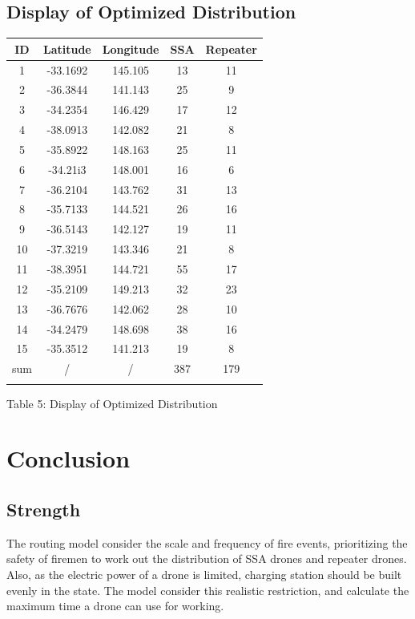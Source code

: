 \documentclass{mcmthesis}
\begin{document}
\subsection{Display of Optimized Distribution}
\begin{center}
	\begin{tabular}{ccccc}
		\hline
		ID & Latitude & Longitude & SSA & Repeater \\
		\hline
		
		1 & -33.1692 & 145.105 & 13 & 11 \\
		2 & -36.3844 & 141.143 & 25 & 9 \\
		3 & -34.2354 & 146.429 & 17 & 12 \\
		4 & -38.0913 & 142.082 & 21 & 8 \\
		5 & -35.8922 & 148.163 & 25 & 11 \\
		6 & -34.21i3 & 148.001 & 16 & 6 \\
		7 & -36.2104 & 143.762 & 31 & 13 \\
		8 & -35.7133 & 144.521 & 26 & 16 \\
		9 & -36.5143 & 142.127 & 19 & 11 \\
		10 & -37.3219 & 143.346 & 21 & 8 \\
		11 & -38.3951 & 144.721 & 55 & 17 \\
		12 & -35.2109 & 149.213 & 32 & 23 \\
		13 & -36.7676 & 142.062 & 28 & 10 \\
		14 & -34.2479 & 148.698 & 38 & 16 \\
		15 & -35.3512 & 141.213 & 19 & 8 \\
		sum & / & /& 387 & 179 \\
		\hline
		\label{table:3D}
	\end{tabular}
\end{center}
\begin{center}
	Table 5: Display of Optimized Distribution
\end{center}

\section{Conclusion}
\subsection{Strength}
The routing model consider the scale and frequency of fire events, prioritizing the safety of firemen to work out the distribution of SSA drones and repeater drones. Also, as the electric power of a drone is limited, charging station should be built evenly in the state. The model consider this realistic restriction, and calculate the maximum time a drone can use for working.  
\end{document}
